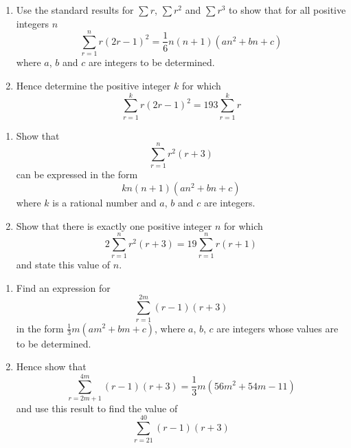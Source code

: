 \documentclass[leqno]{article}
\begin{document}
\begin{enumerate}[
  label=\textbf{\arabic*.},
  leftmargin=*,
  topsep=0pt,
  partopsep=0pt,
  parsep=0pt
]
\questionitem

\begin{enumerate}[label=\textbf{(\alph*)}]
  \item Use the standard results for $\sum r$, $\sum r^2$ and $\sum r^3$ to show that for all positive integers $n$
  \[\sum_{r=1}^{n} r(2r-1)^2 = \dfrac{1}{6}n(n+1)(an^2+bn+c)\]
  where $a$, $b$ and $c$ are integers to be determined.  \\
  \item Hence determine the positive integer $k$ for which
  \[\sum_{r=1}^{k} r(2r-1)^2 = 193\sum_{r=1}^{k} r\] 
\end{enumerate}

\newpage

\questionitem

\begin{enumerate}[label=\textbf{(\alph*)}]
  \item Show that
  \[\sum_{r=1}^{n} r^2(r+3)\]
  can be expressed in the form
  \[kn(n+1)(an^2+bn+c)\]
  where $k$ is a rational number and $a$, $b$ and $c$ are integers.  \\
  \item Show that there is exactly one positive integer $n$ for which
  \[2\sum_{r=1}^{n} r^2(r+3) = 19\sum_{r=1}^{n} r(r+1)\]
  and state this value of $n$.  \\
\end{enumerate}

\newpage

\questionitem

\begin{enumerate}[label=\textbf{(\alph*)}]
  \item Find an expression for
  \[\sum_{r=1}^{2m}(r-1)(r+3)\]
  in the form $\frac{1}{3}m(am^2+bm+c)$, where $a$, $b$, $c$ are integers whose values are to be determined.  \\
  \item Hence show that
  \[\sum_{r=2m+1}^{4m}(r-1)(r+3)=\dfrac{1}{3}m\left(56m^2+54m-11\right)\]
  and use this result to find the value of
  \[\sum_{r=21}^{40}(r-1)(r+3)\] 
\end{enumerate}

\newpage

\questionitem


\end{enumerate}
\end{document}
